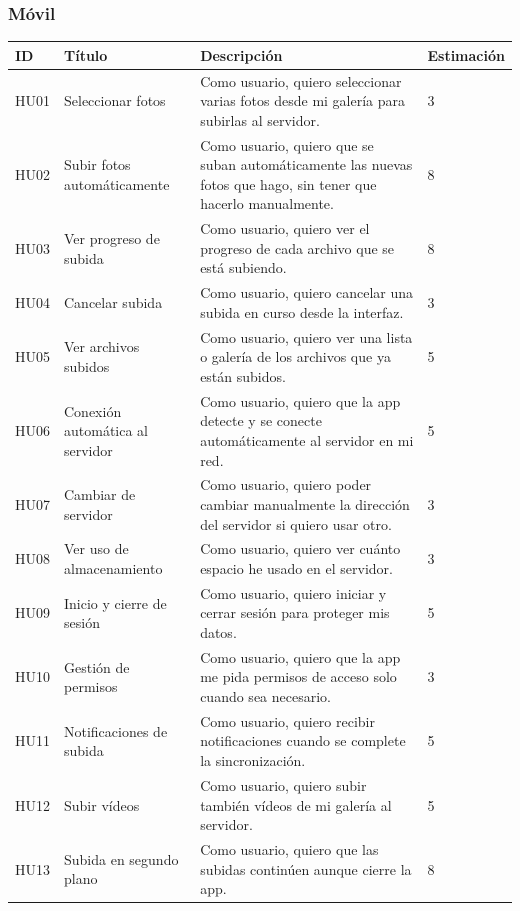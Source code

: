 \subsubsection{Móvil} 
\begin{tabularx}{\textwidth}{|l|l|>{\raggedright\arraybackslash}X|l|}
    \hline
    ID & Título & Descripción & Estimación \\
    \hline
    HU01 & Seleccionar fotos & Como usuario, quiero seleccionar varias fotos desde mi galería para subirlas al servidor. & 3 \\
    \hline
    HU02 & Subir fotos automáticamente & Como usuario, quiero que se suban automáticamente las nuevas fotos que hago, sin tener que hacerlo manualmente. & 8 \\
    \hline
    HU03 & Ver progreso de subida & Como usuario, quiero ver el progreso de cada archivo que se está subiendo. & 8 \\
    \hline
    HU04 & Cancelar subida & Como usuario, quiero cancelar una subida en curso desde la interfaz. & 3 \\
    \hline
    HU05 & Ver archivos subidos & Como usuario, quiero ver una lista o galería de los archivos que ya están subidos. & 5 \\
    \hline
    HU06 & Conexión automática al servidor & Como usuario, quiero que la app detecte y se conecte automáticamente al servidor en mi red. & 5 \\
    \hline
    HU07 & Cambiar de servidor & Como usuario, quiero poder cambiar manualmente la dirección del servidor si quiero usar otro. & 3 \\
    \hline
    HU08 & Ver uso de almacenamiento & Como usuario, quiero ver cuánto espacio he usado en el servidor. & 3 \\
    \hline
    HU09 & Inicio y cierre de sesión & Como usuario, quiero iniciar y cerrar sesión para proteger mis datos. & 5 \\
    \hline
    HU10 & Gestión de permisos & Como usuario, quiero que la app me pida permisos de acceso solo cuando sea necesario. & 3 \\
    \hline
    HU11 & Notificaciones de subida & Como usuario, quiero recibir notificaciones cuando se complete la sincronización. & 5 \\
    \hline
    HU12 & Subir vídeos & Como usuario, quiero subir también vídeos de mi galería al servidor. & 5 \\
    \hline
    HU13 & Subida en segundo plano & Como usuario, quiero que las subidas continúen aunque cierre la app. & 8 \\

\end{tabularx}

